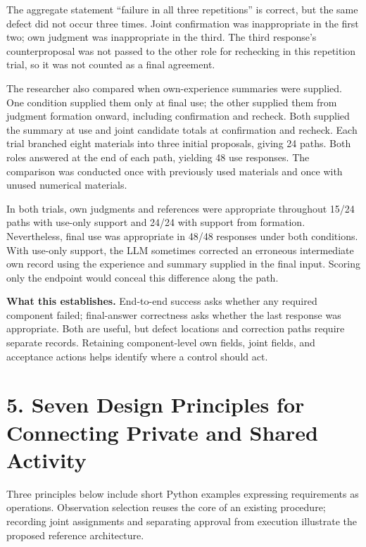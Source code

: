 \documentclass[10pt,a4paper]{article}
\begin{document}
The aggregate statement ``failure in all three repetitions'' is correct, but the same defect did not occur three times. Joint confirmation was inappropriate in the first two; own judgment was inappropriate in the third. The third response's counterproposal was not passed to the other role for rechecking in this repetition trial, so it was not counted as a final agreement.

The researcher also compared when own-experience summaries were supplied. One condition supplied them only at final use; the other supplied them from judgment formation onward, including confirmation and recheck. Both supplied the summary at use and joint candidate totals at confirmation and recheck. Each trial branched eight materials into three initial proposals, giving 24 paths. Both roles answered at the end of each path, yielding 48 use responses. The comparison was conducted once with previously used materials and once with unused numerical materials.

In both trials, own judgments and references were appropriate throughout 15/24 paths with use-only support and 24/24 with support from formation. Nevertheless, final use was appropriate in 48/48 responses under both conditions. With use-only support, the LLM sometimes corrected an erroneous intermediate own record using the experience and summary supplied in the final input. Scoring only the endpoint would conceal this difference along the path.

\textbf{What this establishes.} End-to-end success asks whether any required component failed; final-answer correctness asks whether the last response was appropriate. Both are useful, but defect locations and correction paths require separate records. Retaining component-level own fields, joint fields, and acceptance actions helps identify where a control should act.

\section{5. Seven Design Principles for Connecting Private and Shared Activity}\label{two-role-failure-design-seven-design-principles-for-connecting-private-and-shared-activity}

Three principles below include short Python examples expressing requirements as operations. Observation selection reuses the core of an existing procedure; recording joint assignments and separating approval from execution illustrate the proposed reference architecture.
\end{document}
